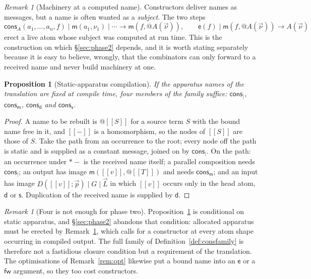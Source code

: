 \documentclass[11pt]{article}
\makeatletter
\theoremstyle{plain}
\newtheorem{proposition}[theorem]{Proposition}
\theoremstyle{definition}
\theoremstyle{remark}
\newtheorem{remark}[theorem]{Remark}
\newcommand{\quo}[1]{@#1}
\newcommand{\drp}[1]{{*}#1}
\newcommand{\enc}[1]{[\![#1]\!]}
\newcommand{\mm}{\mathsf{m}}
\newcommand{\dd}{\mathsf{d}}
\newcommand{\fw}{\mathsf{fw}}
\newcommand{\sy}{\mathsf{s}}
\newcommand{\ev}{\mathsf{e}}
\newcommand{\cons}{\mathsf{cons}}
\newcommand{\red}{\longrightarrow}
\makeatother
\begin{document}
\begin{remark}[Machinery at a computed name]
\label{rem:erect}
Constructors deliver names as messages, but a name is often wanted as a
\emph{subject}. The two steps
\[
  \cons_{A}(a_{1},\dots,a_{n},f) \mid \mm(a_{1},\nu_{1}) \mid \cdots
  \red \mm(f,\quo{A(\vec\nu)}),
  \qquad
  \ev(f) \mid \mm(f,\quo{A(\vec\nu)}) \red A(\vec\nu)
\]
erect a live atom whose subject was computed at run time. This is the
construction on which \S\ref{sec:phase2} depends, and it is worth stating
separately because it is easy to believe, wrongly, that the combinators can
only forward to a received name and never build machinery at one.
\end{remark}

\begin{proposition}[Static-apparatus compilation]
\label{prop:four}
If the apparatus names of the translation are fixed at compile time, four
members of the family suffice: $\cons_{\mid}$, $\cons_{\mm}$, $\cons_{\dd}$
and $\cons_{\sy}$.
\end{proposition}

\begin{proof}
A name to be rebuilt is $\quo{\enc{S}}$ for a source term $S$ with the bound
name free in it, and $\enc{-}$ is a homomorphism, so the nodes of $\enc{S}$
are those of $S$. Take the path from an occurrence to the root; every node
off the path is static and is supplied as a constant message, joined on by
$\cons_{\mid}$. On the path: an occurrence under $\drp{-}$ is the received
name itself; a parallel composition needs $\cons_{\mid}$; an output has image
$\mm(\enc{v},\quo{\enc{T}})$ and needs $\cons_{\mm}$; and an input has image
$D(\enc{v};\vec p) \mid G \mid \vec L$ in which $\enc{v}$ occurs only in the
head atom, $\dd$ or $\sy$. Duplication of the received name is supplied by
$\dd$.
\end{proof}

\begin{remark}[Four is not enough for phase two]
\label{rem:notenough}
Proposition~\ref{prop:four} is conditional on static apparatus, and
\S\ref{sec:phase2} abandons that condition: allocated apparatus must be
erected by Remark~\ref{rem:erect}, which calls for a constructor at every
atom shape occurring in compiled output. The full family of
Definition~\ref{def:consfamily} is therefore not a fastidious closure
condition but a requirement of the translation. The optimisations of
Remark~\ref{rem:opt} likewise put a bound name into an $\ev$ or a $\fw$
argument, so they too cost constructors.
\end{remark}
\end{document}
